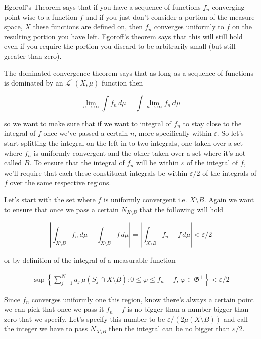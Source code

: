 \documentclass[oneside]{book}
\begin{document}
\begin{enumerate}
Egoroff's Theorem says that if you have a sequence of functions $f_n$ converging point wise to a function $f$ and if you just don't consider a portion of the measure space, $X$ these functions are defined on, then $f_n$ converges uniformly to $f$ on the resulting portion you have left. Egoroff's theorem says that this will still hold even if you require the portion you discard to be arbitrarily small (but still greater than zero). 

The dominated convergence theorem says that as long as a sequence of functions is dominated by an $\mathcal{L}^1(X,\mu)$ function then

\begin{equation}
\lim_{n \to \infty} \int f_n\, d\mu = \int \lim_{n \to \infty} f_n\, d\mu
\end{equation}

so we want to make sure that if we want to integral of $f_n$ to stay close to the integral of $f$ once we've passed a certain $n$, more specifically within $\varepsilon$. So let's start splitting the integral on the left in to two integrals, one taken over a set where $f_n$ is uniformly convergent and the other taken over a set where it's not called $B$. To ensure that the integral of $f_n$ will be within $\varepsilon$ of the integral of $f$, we'll require that each these constituent integrals be within $\varepsilon/2$ of the integrals of $f$ over the same respective regions.

Let's start with the set where $f$ is uniformly convergent i.e. $X \setminus B$. Again we want to ensure that once we pass a certain $N_{X \setminus B}$ that the following will hold

\begin{equation}
\left| \int_{X \setminus B} f_n\, d\mu - \int_{X \setminus B} f\,d\mu \right| = \left| \int_{X \setminus B} f_n-f\,d\mu \right| < \varepsilon /2
\end{equation}

or by definition of the integral of a measurable function

\begin{eqnarray}
\sup \left\{ \sum_{j=1}^N a_j\, \mu(S_j \cap X \setminus B): 0 \le \varphi \le f_n-f,\, \varphi \in \mathfrak{G}^+ \right\} < \varepsilon/2
\end{eqnarray}

Since $f_n$ converges uniformly one this region, know there's always a certain point we can pick that once we pass it $f_n-f$ is no bigger than a number bigger than zero that we specify. Let's specify this number to be $\varepsilon/(2\mu(X \setminus B))$ and call the integer we have to pass $N_{X \setminus B}$ then the integral can be no bigger than $\varepsilon/2$.


\end{enumerate}
\end{document}
